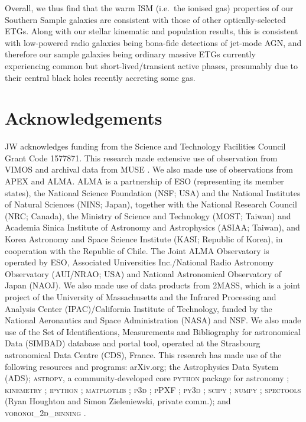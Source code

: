 \documentclass[a4paper,fleqn,usenatbib]{mnras}
\DeclareRobustCommand{\removed}[1]{{\sethlcolor{red}\hl{#1}}}
\DeclareRobustCommand{\added}[1]{{\sethlcolor{green}\hl{#1}}}
\begin{document}
Overall, we thus find that the warm ISM (i.e.\ the ionised gas)
properties of our Southern Sample galaxies are consistent with those
of other optically-selected ETGs. Along with our stellar kinematic and
population results, this is consistent with low-powered radio galaxies
being bona-fide detections of jet-mode AGN, and therefore our sample
galaxies being ordinary massive ETGs currently experiencing common but
short-lived/transient active phases, presumably due to their central
black holes recently accreting some gas.

\section*{Acknowledgements}

JW acknowledges funding from the Science and Technology Facilities
Council Grant Code 1577871. This research made extensive use of
observation from VIMOS \citep{LeFevre2003} and archival data from MUSE
\citep{Bacon2010}. We also made use of observations from APEX
\citep{Gusten2006} and ALMA. ALMA is a partnership of ESO
(representing its member states), the National Science Foundation
(NSF; USA) and the National Institutes of Natural Sciences (NINS;
Japan), together with the National Research Council (NRC; Canada), the
Ministry of Science and Technology (MOST; Taiwan) and Academia Sinica
Institute of Astronomy and Astrophysics (ASIAA; Taiwan), and Korea
Astronomy and Space Science Institute (KASI; Republic of Korea), in
cooperation with the Republic of Chile. The Joint ALMA Observatory is
operated by ESO, Associated Universities Inc./National Radio Astronomy
Observatory (AUI/NRAO; USA) and National Astronomical Observatory of
Japan (NAOJ). We also made use of data products from 2MASS, which is a
joint project of the University of Massachusetts and the Infrared
Processing and Analysis Center (IPAC)/California Institute of
Technology, funded by the National Aeronautics and Space
Administration (NASA) and NSF. We also made use of the Set of
Identifications, Measurements and Bibliography for astronomical Data
(SIMBAD) database and portal tool, operated at the Strasbourg
astronomical Data Centre (CDS), France. This research has made use of
the following resources and programs: arXiv.org; the Astrophysics Data
System (ADS); \textsc{astropy}, a community-developed core
\textsc{python} package for astronomy
\citep{TheAstropyCollaboration2013}; \textsc{kinemetry}
\citep{Krajnovic2006}; \textsc{ipython} \citep{Perez2007};
\textsc{matplotlib} \citep{Hunter2007}; \textsc{p3d}
\citep{Sandin2010, Sandin2011}; \textsc{pPXF} \citep{Cappellari2004};
\textsc{py3d} \citep{Sanchez2011, Husemann2013, Husemann2014};
\textsc{scipy} \citep{Oliphant2007, Millman2011}; \textsc{numpy}
\citep{VanderWalt2011}; \textsc{spectools} (Ryan Houghton and Simon
Zieleniewski, private comm.); and \textsc{voronoi\_2d\_binning}
\citep[including the SAURON \added{Colourmaps}\removed{colourmaps} 
{\bf (Colourmaps, whatever that might be, or colour table? Clarify.)}; ][]{Cappellari2003}.
\end{document}

